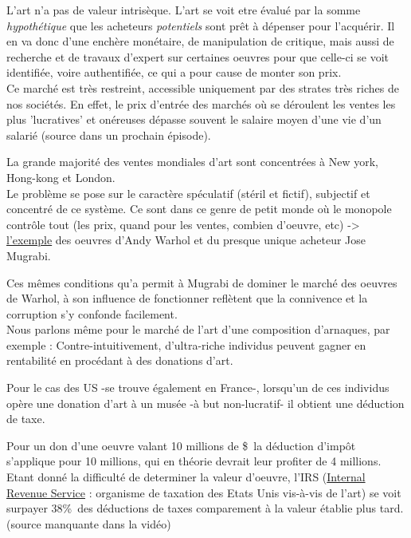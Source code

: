 \documentclass{article}
\begin{document}
L'art n'a pas de valeur intrisèque.
L'art se voit etre évalué par la somme \emph{hypothétique} que les acheteurs \emph{potentiels} sont prêt à dépenser pour l'acquérir. Il en va donc d'une enchère monétaire, de manipulation de critique, mais aussi de recherche et de travaux d'expert sur certaines oeuvres pour que celle-ci se voit identifiée, voire authentifiée, ce qui a pour cause de monter son prix.
\\

Ce marché est très restreint, accessible uniquement par des strates très riches de nos sociétés. En effet, le prix d'entrée des marchés où se déroulent les ventes les plus 'lucratives' et onéreuses dépasse souvent le salaire moyen d'une vie d'un salarié (source dans un prochain épisode).

La grande majorité des ventes mondiales d'art sont concentrées à New york, Hong-kong et London.
\\

Le problème se pose sur le caractère spéculatif (stéril et fictif), subjectif et concentré de ce système. Ce sont dans ce genre de petit monde où le monopole contrôle tout (les prix, quand pour les ventes, combien d'oeuvre, etc) -> \href{https://youtu.be/ZZ3F3zWiEmc?t=895}{l'exemple} des oeuvres d'Andy Warhol et du presque unique acheteur Jose Mugrabi.

Ces mêmes conditions qu'a permit à Mugrabi de dominer le marché des oeuvres de Warhol, à son influence de fonctionner reflètent que la connivence et la corruption s'y confonde facilement.
\\

Nous parlons même pour le marché de l'art d'une composition d'arnaques, par exemple : \newline
Contre-intuitivement, d'ultra-riche individus peuvent gagner en rentabilité en procédant à des donations d'art.

    Pour le cas des US -se trouve également en France-, lorsqu'un de ces individus opère une donation d'art à un musée -à but non-lucratif- il obtient une déduction de taxe.
    
        Pour un don d'une oeuvre valant 10 millions de \$\, la déduction d'impôt s'applique pour 10 millions, qui en théorie devrait leur profiter de 4 millions.
    Etant donné la difficulté de determiner la valeur d'oeuvre, l'IRS (\href{https://www.irs.gov/}{Internal Revenue Service} : organisme de taxation des Etats Unis vis-à-vis de l'art) se voit surpayer 38\%\ des déductions de taxes comparement à la valeur établie plus tard. (source manquante dans la vidéo)
    
\end{document}
